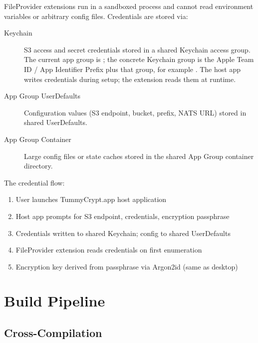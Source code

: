 \documentclass[11pt,a4paper]{article}
\begin{document}
FileProvider extensions run in a sandboxed process and cannot read environment
variables or arbitrary config files. Credentials are stored via:

\begin{description}
  \item[Keychain] S3 access and secret credentials stored in a shared Keychain
    access group. The current app group is
    ; the concrete Keychain group is the Apple
    Team ID / App Identifier Prefix plus that group, for example
    . The host app writes credentials
    during setup; the extension reads them at runtime.
  \item[App Group UserDefaults] Configuration values (S3 endpoint, bucket,
    prefix, NATS URL) stored in shared UserDefaults.
  \item[App Group Container] Large config files or state caches stored in
    the shared App Group container directory.
\end{description}

The credential flow:

\begin{enumerate}
  \item User launches TummyCrypt.app host application
  \item Host app prompts for S3 endpoint, credentials, encryption passphrase
  \item Credentials written to shared Keychain; config to shared UserDefaults
  \item FileProvider extension reads credentials on first enumeration
  \item Encryption key derived from passphrase via Argon2id (same as desktop)
\end{enumerate}

\section{Build Pipeline}

\subsection{Cross-Compilation}
\end{document}
